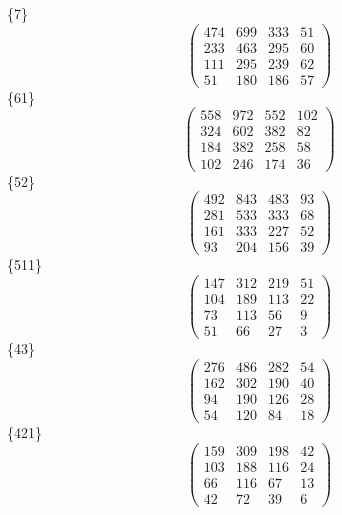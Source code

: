 \documentclass[12pt,reqno]{amsart}
\begin{document}
\Large
\{7\}                             $$ \begin{pmatrix} 
                       474 & 699 & 333 & 51 \\[6pt]
                       233 & 463 & 295 & 60 \\[6pt]
                       111 & 295 & 239 & 62 \\[6pt]
                          51 & 180 & 186 & 57
                              \end{pmatrix} $$ 
\{61\}                             $$ \begin{pmatrix} 
                       558 & 972 & 552 & 102 \\[6pt]
                       324 & 602 & 382 & 82 \\[6pt]
                       184 & 382 & 258 & 58 \\[6pt]
                         102 & 246 & 174 & 36
                              \end{pmatrix} $$ 
\{52\}                             $$ \begin{pmatrix} 
                       492 & 843 & 483 & 93 \\[6pt]
                       281 & 533 & 333 & 68 \\[6pt]
                       161 & 333 & 227 & 52 \\[6pt]
                          93 & 204 & 156 & 39
                              \end{pmatrix} $$ 
\{511\}                             $$ \begin{pmatrix} 
                       147 & 312 & 219 & 51 \\[6pt]
                       104 & 189 & 113 & 22 \\[6pt]
                         73 & 113 & 56 & 9 \\[6pt]
                           51 & 66 & 27 & 3
                              \end{pmatrix} $$ 
\{43\}                             $$ \begin{pmatrix} 
                       276 & 486 & 282 & 54 \\[6pt]
                       162 & 302 & 190 & 40 \\[6pt]
                        94 & 190 & 126 & 28 \\[6pt]
                          54 & 120 & 84 & 18
                              \end{pmatrix} $$ 
\{421\}                             $$ \begin{pmatrix} 
                       159 & 309 & 198 & 42 \\[6pt]
                       103 & 188 & 116 & 24 \\[6pt]
                        66 & 116 & 67 & 13 \\[6pt]
                           42 & 72 & 39 & 6
                              \end{pmatrix} $$ 
\end{document}
